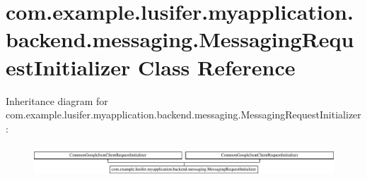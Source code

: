 \hypertarget{classcom_1_1example_1_1lusifer_1_1myapplication_1_1backend_1_1messaging_1_1_messaging_request_initializer}{}\section{com.\+example.\+lusifer.\+myapplication.\+backend.\+messaging.\+Messaging\+Request\+Initializer Class Reference}
\label{classcom_1_1example_1_1lusifer_1_1myapplication_1_1backend_1_1messaging_1_1_messaging_request_initializer}
Inheritance diagram for com.\+example.\+lusifer.\+myapplication.\+backend.\+messaging.\+Messaging\+Request\+Initializer\+:\begin{figure}[H]
\begin{center}
\leavevmode
\includegraphics[height=1.149897cm]{classcom_1_1example_1_1lusifer_1_1myapplication_1_1backend_1_1messaging_1_1_messaging_request_initializer}
\end{center}
\end{figure}
